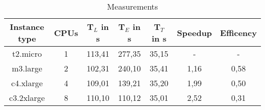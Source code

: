 \documentclass{article}
\begin{document}
\begin{table}[htbp]
\centering
\begin{tabular}{ | c | c | c | c | c | c | c | }
\hline
\textbf{Instance type} & \textbf{CPUs} & \textbf{T$_{L}$} in s & \textbf{T$_{E}$} in s & \textbf{T$_{T}$} in s & \textbf{Speedup} & \textbf{Efficency} \\
\hline \hline
t2.micro & 1 & 113,41 & 277,35 & 35,15 & - & - \\
\hline
m3.large & 2 & 102,31 & 240,10 & 35,41 & 1,16 & 0,58 \\
\hline
c4.xlarge & 4 & 109,01 & 139,21 & 35,20 & 1,99 & 0,50 \\
\hline
c3.2xlarge & 8 & 110,10 & 110,12 & 35,01 & 2,52 & 0,31 \\
\hline
\end{tabular}
\caption{Measurements}
\label{tab:measurements}
\end{table}
%





%
\end{document}

